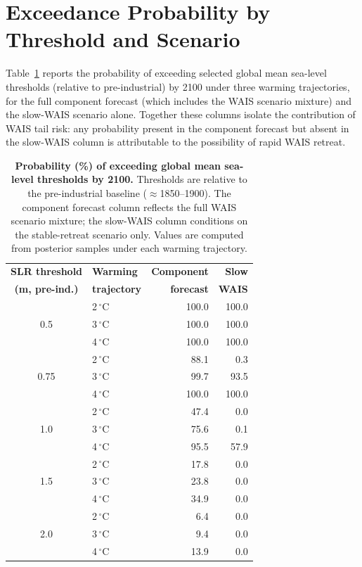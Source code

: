 \documentclass[12pt]{article}
\begin{document}
\section{Exceedance Probability by Threshold and Scenario}
\label{sec:exceedance_table}

Table~\ref{tab:exceedance} reports the probability of exceeding selected global mean sea-level thresholds (relative to pre-industrial) by 2100 under three warming trajectories, for the full component forecast (which includes the WAIS scenario mixture) and the slow-WAIS scenario alone. Together these columns isolate the contribution of WAIS tail risk: any probability present in the component forecast but absent in the slow-WAIS column is attributable to the possibility of rapid WAIS retreat.

\begin{table}[h!]
\centering
\caption{\textbf{Probability (\%) of exceeding global mean sea-level thresholds by 2100.} Thresholds are relative to the pre-industrial baseline ($\approx$1850--1900). The component forecast column reflects the full WAIS scenario mixture; the slow-WAIS column conditions on the stable-retreat scenario only. Values are computed from posterior samples under each warming trajectory.}
\label{tab:exceedance}
\begin{tabular}{cl rr}
\hline
\textbf{SLR threshold} & \textbf{Warming} & \textbf{Component} & \textbf{Slow} \\
\textbf{(m, pre-ind.)} & \textbf{trajectory} & \textbf{forecast} & \textbf{WAIS} \\
\hline
\multirow{3}{*}{0.5}  & 2\,$^\circ$C & 100.0 & 100.0 \\
                       & 3\,$^\circ$C & 100.0 & 100.0 \\
                       & 4\,$^\circ$C & 100.0 & 100.0 \\
\hline
\multirow{3}{*}{0.75} & 2\,$^\circ$C &  88.1 &   0.3 \\
                       & 3\,$^\circ$C &  99.7 &  93.5 \\
                       & 4\,$^\circ$C & 100.0 & 100.0 \\
\hline
\multirow{3}{*}{1.0}  & 2\,$^\circ$C &  47.4 &   0.0 \\
                       & 3\,$^\circ$C &  75.6 &   0.1 \\
                       & 4\,$^\circ$C &  95.5 &  57.9 \\
\hline
\multirow{3}{*}{1.5}  & 2\,$^\circ$C &  17.8 &   0.0 \\
                       & 3\,$^\circ$C &  23.8 &   0.0 \\
                       & 4\,$^\circ$C &  34.9 &   0.0 \\
\hline
\multirow{3}{*}{2.0}  & 2\,$^\circ$C &   6.4 &   0.0 \\
                       & 3\,$^\circ$C &   9.4 &   0.0 \\
                       & 4\,$^\circ$C &  13.9 &   0.0 \\
\hline
\end{tabular}
\end{table}
\end{document}
